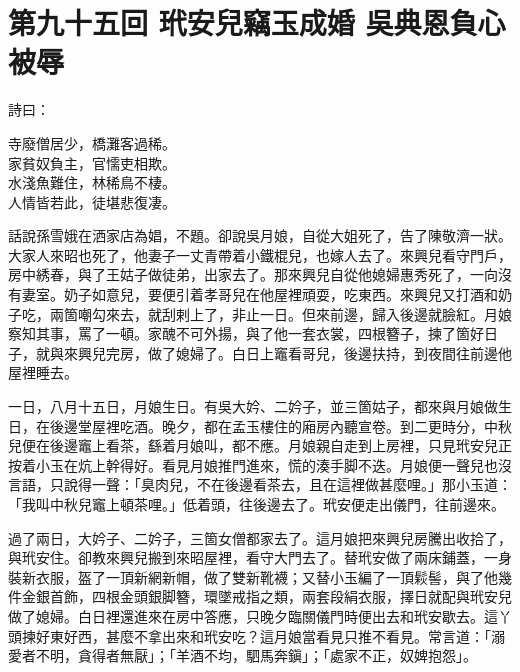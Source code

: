 
\chapter*{第九十五回 玳安兒竊玉成婚 吳典恩負心被辱}


詩曰：

\begin{myquote}
寺廢僧居少，橋灘客過稀。\\家貧奴負主，官懦吏相欺。\\水淺魚難住，林稀鳥不棲。\\人情皆若此，徒堪悲復凄。
\end{myquote}

話說孫雪娥在洒家店為娼，不題。卻說吳月娘，自從大姐死了，告了陳敬濟一狀。大家人來昭也死了，他妻子一丈青帶着小鐵棍兒，也嫁人去了。來興兒看守門戶，房中綉春，與了王姑子做徒弟，出家去了。{}那來興兒自從他媳婦惠秀死了，一向沒有妻室。奶子如意兒，要便引着孝哥兒在他屋裡頑耍，吃東西。來興兒又打酒和奶子吃，兩箇嘲勾來去，就刮剌上了，非止一日。但來前邊，歸入後邊就臉紅。月娘察知其事，罵了一頓。家醜不可外揚，與了他一套衣裳，四根簪子，揀了箇好日子，就與來興兒完房，做了媳婦了。白日上竈看哥兒，後邊扶持，到夜間往前邊他屋裡睡去。

一日，八月十五日，月娘生日。有吳大妗、二妗子，並三箇姑子，都來與月娘做生日，在後邊堂屋裡吃酒。晚夕，都在孟玉樓住的廂房內聽宣卷。到二更時分，中秋兒便在後邊竈上看茶，繇着月娘叫，都不應。月娘親自走到上房裡，只見玳安兒正按着小玉在炕上幹得好。看見月娘推門進來，慌的湊手脚不迭。月娘便一聲兒也沒言語，{}只說得一聲：「臭肉兒，不在後邊看茶去，且在這裡做甚麼哩。」那小玉道：「我叫中秋兒竈上頓茶哩。」低着頭，往後邊去了。玳安便走出儀門，往前邊來。

過了兩日，大妗子、二妗子，三箇女僧都家去了。這月娘把來興兒房騰出收拾了，與玳安住。卻教來興兒搬到來昭屋裡，看守大門去了。替玳安做了兩床鋪蓋，一身裝新衣服，盔了一頂新網新帽，做了雙新靴襪；又替小玉編了一頂鬏髻，與了他幾件金銀首飾，四根金頭銀脚簪，環墜戒指之類，兩套段絹衣服，擇日就配與玳安兒做了媳婦。{}白日裡還進來在房中答應，只晚夕臨關儀門時便出去和玳安歇去。這丫頭揀好東好西，甚麼不拿出來和玳安吃？這月娘當看見只推不看見。常言道：「溺愛者不明，貪得者無厭」；「羊酒不均，駟馬奔鎭」；「處家不正，奴婢抱怨」。

